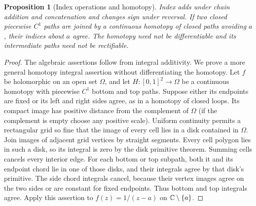 \documentclass[11pt,a4paper,openany]{book}
\newtheorem{proposition}[theorem]{Proposition}
\theoremstyle{definition}
\theoremstyle{remark}\newtheorem{remark}[theorem]{Remark}
\newcommand{\family}[1]{}
\begin{document}
\begin{proposition}[Index operations and homotopy]\family{D12.04.04}\label{d12:04-04}
Index adds under chain addition and concatenation and changes sign under
reversal. If two closed piecewise \(C^1\) paths are joined by a continuous
homotopy of closed paths avoiding \(a\), their indices about \(a\) agree.
The homotopy need not be differentiable and its intermediate paths need
not be rectifiable.
\end{proposition}
\begin{proof}
The algebraic assertions follow from integral additivity.
We prove a more general homotopy integral assertion without differentiating
the homotopy. Let \(f\) be holomorphic on an open set \(\Omega\), and let
\(H:[0,1]^2\to\Omega\) be a continuous homotopy with piecewise \(C^1\)
bottom and top paths. Suppose either its endpoints are fixed or its
left and right sides agree, as in a homotopy of closed loops.
Its compact image has positive distance from the complement of \(\Omega\)
(if the complement is empty choose any positive scale).
Uniform continuity permits a rectangular grid so fine that the image
of every cell lies in a disk contained in \(\Omega\).
Join images of adjacent grid vertices by straight segments.
Every cell polygon lies in such a disk, so its integral is zero by
the disk primitive theorem. Summing cells cancels every interior edge.
For each bottom or top subpath, both it and its endpoint chord lie in
one of those disks, and their integrals agree by that disk's primitive.
The side chord integrals cancel, because their vertex images agree on
the two sides or are constant for fixed endpoints.
Thus bottom and top integrals agree.
Apply this assertion to \(f(z)=1/(z-a)\) on \(\mathbb C\setminus\{a\}\).
\end{proof}
\end{document}
